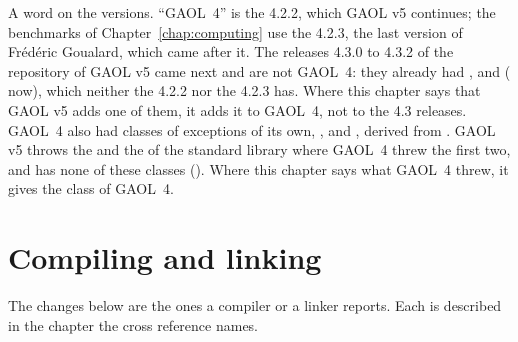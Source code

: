 \documentclass[12pt,a4paper,twoside,openright]{book}
\begin{document}
\medskip
A word on the versions. ``GAOL~4'' is the 4.2.2, which GAOL v5 continues;
the benchmarks of Chapter~\ref{chap:computing} use the 4.2.3, the last
version of Fr\'ed\'eric Goualard, which came after it. The releases 4.3.0 to
4.3.2 of the repository of GAOL v5 came next and are not GAOL~4: they already
had ,  and 
( now), which neither the 4.2.2 nor the 4.2.3 has.
Where this chapter says that GAOL v5 adds one of them, it adds it to GAOL~4,
not to the 4.3 releases. GAOL~4 also had classes of exceptions of its own,
,  and
, derived from . GAOL
v5 throws the  and the 
of the standard library where GAOL~4 threw the first two, and has none of
these classes (). Where this chapter says what GAOL~4
threw, it gives the class of GAOL~4.

\section{Compiling and linking}\label{sec:migration-compile}
%

The changes below are the ones a compiler or a linker reports. Each is
described in the chapter the cross reference names.
\end{document}
